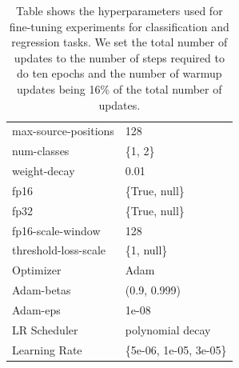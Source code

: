 \documentclass{article} %
\begin{document}
\begin{table}[h]
\begin{tabular}{@{}ll@{}}
max-source-positions        & 128                   \\
num-classes                 & \{1, 2\}              \\
weight-decay                & 0.01                  \\
fp16                        & \{True, null\}        \\
fp32                        & \{True, null\}        \\
fp16-scale-window           & 128        \\
threshold-loss-scale        & \{1, null\}           \\
Optimizer                   & Adam                      \\
Adam-betas                  & (0.9, 0.999)              \\
Adam-eps                    & 1e-08                 \\
LR Scheduler                & polynomial decay          \\
Learning Rate               & \{5e-06, 1e-05, 3e-05\}                     \\

\bottomrule
\end{tabular}
\quad

\caption{Table shows the hyperparameters used for fine-tuning experiments for classification and regression tasks. We set the total number of updates to the number of steps required to do ten epochs and the number of warmup updates being 16\% of the total number of updates.}
\label{tab:hyperparams-finetune}
\end{table}
\end{document}
